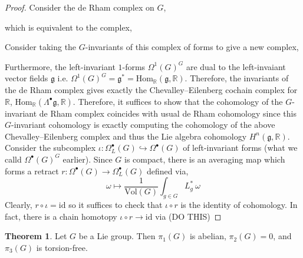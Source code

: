 \documentclass[12pt]{extarticle}
\newcommand{\Hom}[3]{\mathrm{Hom}_{#1}\left( #2, #3 \right)}
\newcommand{\R}{\mathbb{R}}
\newcommand{\id}{\mathrm{id}}
\theoremstyle{definition}
\newtheorem{theorem}{Theorem}[section]
\newcommand{\g}{\mathfrak{g}}
\newcommand{\embed}{\hookrightarrow}
\begin{document}
\begin{proof}
Consider the de Rham complex on $G$,
\begin{center}
\end{center}
which is equivalent to the complex,
\begin{center}
\end{center}
Consider taking the $G$-invariants of this complex of forms to give a new complex,
\begin{center}
\end{center}
Furthermore, the left-invariant $1$-forms $\Omega^1(G)^G$ are dual to the left-invaiant vector fields $\g$ i.e. $\Omega^1(G)^G = \g^* = \Hom{\R}{\g}{\R}$. Therefore, the invariants of the de Rham complex gives exactly the Chevalley–Eilenberg cochain complex for $\R$, $\Hom{\R}{\Lambda^\bullet \g}{\R}$. 
Therefore, it suffices to show that the cohomology of  the $G$-invariant de Rham complex coincides with usual de Rham cohomology since this $G$-invariant cohomology is exactly computing the cohomology of the above Chevalley–Eilenberg complex and thus the Lie algebra cohomology $H^n(\g, \R)$.  
\bigskip\\
Consider the subcomplex $\iota : \Omega_L^\bullet(G) \embed \Omega^\bullet(G)$ of left-invariant forms (what we calld $\Omega^\bullet(G)^G$ earlier). Since $G$ is compact, there is an averaging map which forms a retract $r : \Omega^\bullet(G) \to \Omega_L^\bullet(G)$ defined via,
\[ \omega \mapsto \frac{1}{\mathrm{Vol}(G)} \int_{g \in G} L^*_g \: \omega \]
Clearly, $r \circ \iota = \id$ so it suffices to check that $\iota \circ r$ is the identity of cohomology. In fact, there is a chain homotopy $\iota \circ r \to \id$ via (DO THIS)
\end{proof}

\begin{theorem}
Let $G$ be a Lie group. Then $\pi_1(G)$ is abelian, $\pi_2(G) = 0$, and $\pi_3(G)$ is torsion-free.
\end{theorem}
\end{document}
